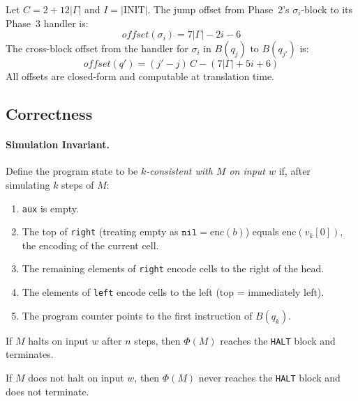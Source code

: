 Let $C = 2 + 12|\Gamma|$ and $I = |\mathrm{INIT}|$. The jump offset from Phase~2's $\sigma_i$-block to its Phase~3 handler is:
\[
  \textit{offset}(\sigma_i) = 7|\Gamma| - 2i - 6
\]
The cross-block offset from the handler for $\sigma_i$ in $B(q_j)$ to $B(q_{j'})$ is:
\[
  \textit{offset}(q') = (j' - j)\,C - (7|\Gamma| + 5i + 6)
\]
All offsets are closed-form and computable at translation time.

\subsection{Correctness}
\label{sec:results:turing:correctness}

\paragraph{Simulation Invariant.}
Define the \sculpt program state to be \emph{$k$-consistent with $M$ on input $w$} if, after simulating $k$ steps of $M$:
\begin{enumerate}
    \item \texttt{aux} is empty.
    \item The top of \texttt{right} (treating empty as $\texttt{nil} = \mathrm{enc}(b)$) equals $\mathrm{enc}(v_k[0])$, the encoding of the current cell.
    \item The remaining elements of \texttt{right} encode cells to the right of the head.
    \item The elements of \texttt{left} encode cells to the left (top = immediately left).
    \item The program counter points to the first instruction of $B(q_k)$.
\end{enumerate}

\begin{theorem}
\label{thm:halting}
If $M$ halts on input $w$ after $n$ steps, then $\Phi(M)$ reaches the \texttt{HALT} block and terminates.
\end{theorem}

\begin{theorem}
\label{thm:nonhalt}
If $M$ does not halt on input $w$, then $\Phi(M)$ never reaches the \texttt{HALT} block and does not terminate.
\end{theorem}


